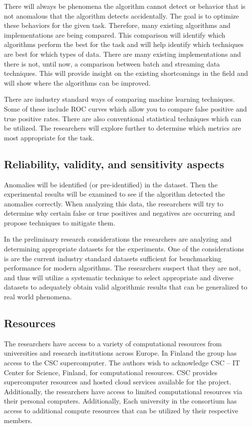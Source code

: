 There will always be phenomena the algorithm cannot detect or behavior that is not anomalous that the algorithm detects accidentally. The goal is to optimize these behaviors for the given task. Therefore, many existing algorithms and implementations are being compared. This comparison will identify which algorithms perform the best for the task and will help identify which techniques are best for which types of data. There are many existing implementations and there is not, until now, a comparison between batch and streaming data techniques. This will provide insight on the existing shortcomings in the field and will show where the algorithms can be improved.

There are industry standard ways of comparing machine learning techniques. Some of these include ROC curves which allow you to compare false positive and true positive rates. There are also conventional statistical techniques which can be utilized. The researchers will explore further to determine which metrics are most appropriate for the task.

\subsection{Reliability, validity, and sensitivity aspects}
Anomalies will be identified (or pre-identified) in the dataset. Then the experimental results will be examined to see if the algorithm detected the anomalies correctly. When analyzing this data, the researchers will try to determine why certain false or true positives and negatives are occurring and propose techniques to mitigate them.

In the preliminary research considerations the researchers are analyzing and determining appropriate datasets for the experiments. One of the considerations is are the current industry standard datasets sufficient for benchmarking performance for modern algorithms. The researchers suspect that they are not, and thus will utilize a systematic technique to select appropriate and diverse datasets to adequately obtain valid algorithmic results that can be generalized to real world phenomena. 


\subsection{Resources}

The researchers have access to a variety of computational resources from universities and research institutions across Europe. In Finland the group has access to the CSC supercomputer. The authors wish to acknowledge CSC – IT Center for Science, Finland, for computational resources. CSC provides supercomputer resources and hosted cloud services available for the project. Additionally, the researchers have access to limited computational resources via their personal computers. Additionally, Each university in the consortium has access to additional compute resources that can be utilized by their respective members.

